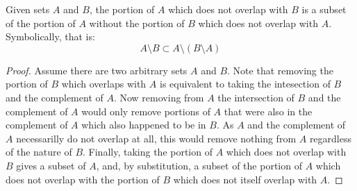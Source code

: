\documentclass[main.tex]{subfiles}
\begin{document}
\begin{thm}
	Given sets \(A\) and \(B\), the portion of \(A\) which does not overlap
	with \(B\) is a subset of the portion of \(A\) without the portion of
	\(B\) which does not overlap with \(A\). Symbolically, that is:
	\[A \setminus B \subset A \setminus (B \setminus A)\]
\end{thm}
\begin{proof}
	Assume there are two arbitrary sets \(A\) and \(B\). Note that removing
	the portion of \(B\) which overlaps with \(A\) is equivalent to taking
	the intesection of \(B\) and the complement of \(A\). Now removing from
	\(A\) the intersection of \(B\) and the complement of \(A\) would only
	remove portions of \(A\) that were also in the complement of \(A\) which
	also happened to be in \(B\). As \(A\) and the complement of \(A\)
	necessarilly do not overlap at all, this would remove nothing from \(A\)
	regardless of the nature of \(B\). Finally, taking the portion of \(A\)
	which does not overlap with \(B\) gives a subset of \(A\), and, by
	substitution, a subset of the portion of \(A\) which does not overlap
	with the portion of \(B\) which does not itself overlap with \(A\).
\end{proof}
\end{document}

